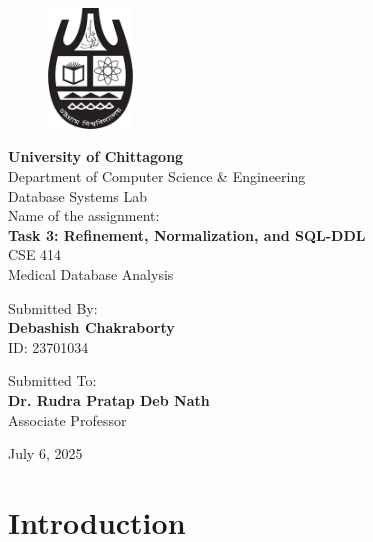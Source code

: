 \documentclass[12pt,a4paper]{article}
\begin{document}
\begin{titlepage}
    \begin{figure}[htbp]
    \centering
    \includegraphics[width=0.2\textwidth]{cu.png}
    \end{figure}
    \centering
    \vspace*{0.5cm}
    {\Huge\bfseries University of Chittagong}\\[0.5cm]
    {\Large Department of Computer Science \& Engineering}\\[0.5cm]
    {\large Database Systems Lab}\\[2cm]
    
    {\large Name of the assignment:}\\[0.3cm]
    {\LARGE\bfseries Task 3: Refinement, Normalization, and SQL-DDL\\[0.5cm]}
    {\large CSE 414}\\[0.5cm]
    {\large Medical Database Analysis}\\[3cm]
    
    \begin{minipage}[t]{0.4\textwidth}
    \raggedleft
    Submitted By:\\
    \large \textbf{Debashish Chakraborty}\\
    \large ID: 23701034
    \end{minipage}
    \hspace{0.05\textwidth}
    \vrule width 1pt
    \hspace{0.05\textwidth}
    \begin{minipage}[t]{0.4\textwidth}
    Submitted To:\\
    \large \textbf{Dr. Rudra Pratap Deb Nath}\\
    \large Associate Professor
    \end{minipage}
    
    \vfill
    {\large July 6, 2025}
\end{titlepage}

\newpage
\tableofcontents
\newpage 

\section{Introduction}
\end{document}
